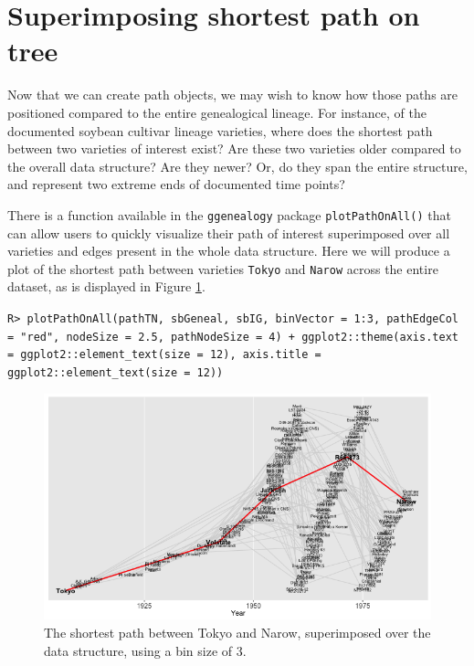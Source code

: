 \documentclass[11pt,a4paper,oldfontcommands,openany]{memoir}
\DeclareRobustCommand{\mybox}[2][gray!15]{%
\begin{tcolorbox}[   %
        breakable,
        left=0pt,
        right=0pt,
        top=0pt,
        bottom=0pt,
        colback=#1,
        colframe=#1,
        width=\dimexpr\textwidth\relax, 
        enlarge left by=0mm,
        boxsep=5pt,
        arc=0pt,outer arc=0pt,
        ]
        #2
\end{tcolorbox}
}
\numberwithin{equation}{section} %
\newcommand{\code}[1]{{\texttt{#1}}}
\newcommand{\pkg}[1]{{\texttt{#1}}}
\begin{document}
\section{Superimposing shortest path on tree}

Now that we can create path objects, we may wish to know how those paths are positioned compared to the entire genealogical lineage. For instance, of the documented soybean cultivar lineage varieties, where does the shortest path between two varieties of interest exist? Are these two varieties older compared to the overall data structure? Are they newer? Or, do they span the entire structure, and represent two extreme ends of documented time points?

There is a function available in the \pkg{ggenealogy} package \code{plotPathOnAll()} that can allow users to quickly visualize their path of interest superimposed over all varieties and edges present in the whole data structure. Here we will produce a plot of the shortest path between varieties \code{Tokyo} and \code{Narow} across the entire dataset, as is displayed in Figure \ref{fig:plotTNBin3}.

\mybox{
\texttt{R> plotPathOnAll(pathTN, sbGeneal, sbIG, binVector = 1:3, pathEdgeCol = "red", nodeSize = 2.5, pathNodeSize = 4) + ggplot2::theme(axis.text = ggplot2::element\_text(size = 12), axis.title = ggplot2::element\_text(size = 12))}
}

\begin{figure}%
    \begin{framed}
    \centering
    \includegraphics[width=\textwidth]{plotTNBin3}
    \end{framed}
    \caption{The shortest path between Tokyo and Narow, superimposed over the data structure, using a bin size of 3.}
    \label{fig:plotTNBin3}
\end{figure}
\end{document}
